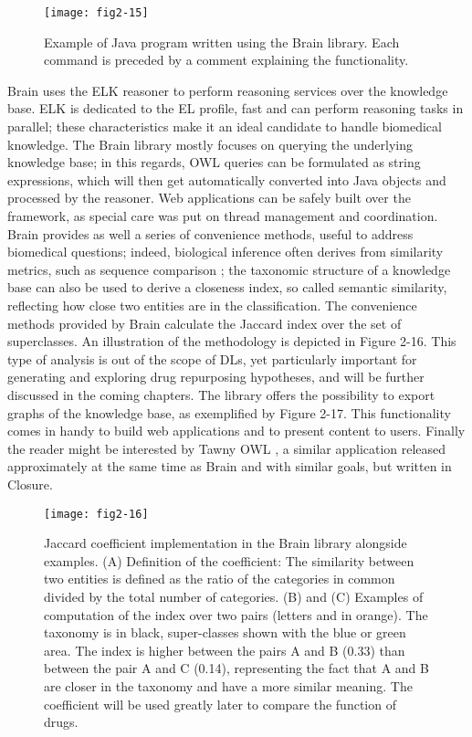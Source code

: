 \begin{figure}[ht]
    \centering
    \texttt{[image: fig2-15]}
    \caption{Example of Java program written using the Brain library. Each command is preceded by a comment explaining the functionality.}
    \label{fig2-15}
\end{figure}

Brain uses the ELK reasoner \citep{kazakov2013incredible} to perform reasoning services over the knowledge base. ELK is dedicated to the EL profile, fast \citep{gonccalves2013owl} and can perform reasoning tasks in parallel; these characteristics make it an ideal candidate to handle biomedical knowledge. The Brain library mostly focuses on querying the underlying knowledge base; in this regards, OWL queries can be formulated as string expressions, which will then get automatically converted into Java objects and processed by the reasoner. Web applications can be safely built over the framework, as special care was put on thread management and coordination. Brain provides as well a series of convenience methods, useful to address biomedical questions; indeed, biological inference often derives from similarity metrics, such as sequence comparison \citep{stevens2007using}; the taxonomic structure of a knowledge base can also be used to derive a closeness index, so called semantic similarity, reflecting how close two entities are in the classification. The convenience methods provided by Brain calculate the Jaccard index over the set of superclasses. An illustration of the methodology is depicted in Figure 2-16. This type of analysis is out of the scope of DLs, yet particularly important for generating and exploring drug repurposing hypotheses, and will be further discussed in the coming chapters. The library offers the possibility to export graphs of the knowledge base, as exemplified by Figure 2-17. This functionality comes in handy to build web applications and to present content to users. Finally the reader might be interested by Tawny OWL \citep{lord2013semantic}, a similar application released approximately at the same time as Brain and with similar goals, but written in Closure.

\begin{figure}[ht]
    \centering
    \texttt{[image: fig2-16]}
    \caption{Jaccard coefficient implementation in the Brain library alongside examples. (A) Definition of the coefficient: The similarity between two entities is defined as the ratio of the categories in common divided by the total number of categories. (B) and (C) Examples of computation of the index over two pairs (letters and in orange). The taxonomy is in black, super-classes shown with the blue or green area. The index is higher between the pairs A and B (0.33) than between the pair A and C (0.14), representing the fact that A and B are closer in the taxonomy and have a more similar meaning.  The coefficient will be used greatly later to compare the function of drugs.}
    \label{fig2-16}
\end{figure}

